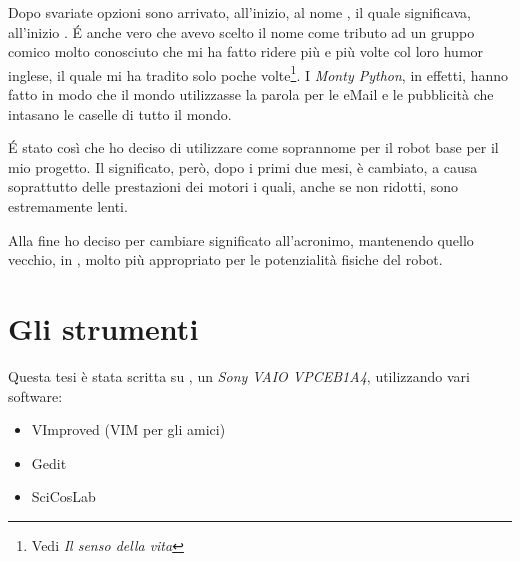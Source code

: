 Dopo svariate opzioni sono arrivato, all'inizio, al nome \SPAM{}, il quale
significava, all'inizio . \'E
anche vero che avevo scelto il nome come tributo ad un gruppo comico molto
conosciuto che mi ha fatto ridere più e più volte col loro humor inglese,
il quale mi ha tradito solo poche volte\footnote{Vedi \emph{Il senso della
vita}}. I \emph{Monty Python}, in effetti, hanno fatto in modo che il mondo
utilizzasse la parola \SPAM{} per le eMail e le pubblicità che intasano le
caselle di tutto il mondo.

\'E stato così che ho deciso di utilizzare \SPAM{} come soprannome per il
robot base per il mio progetto. Il significato, però, dopo i primi due
mesi, è cambiato, a causa soprattutto delle prestazioni dei motori i quali,
anche se non ridotti, sono estremamente lenti.

Alla fine ho deciso per cambiare significato all'acronimo, mantenendo
quello vecchio, in , molto più
appropriato per le potenzialità fisiche del robot.

\section*{Gli strumenti}
Questa tesi è stata scritta su , un \emph{Sony VAIO
VPCEB1A4}, utilizzando vari software:
\begin{itemize}
    \item VImproved (VIM per gli amici)
    \item Gedit
    \item SciCosLab
\end{itemize}

\cleardoublepage
